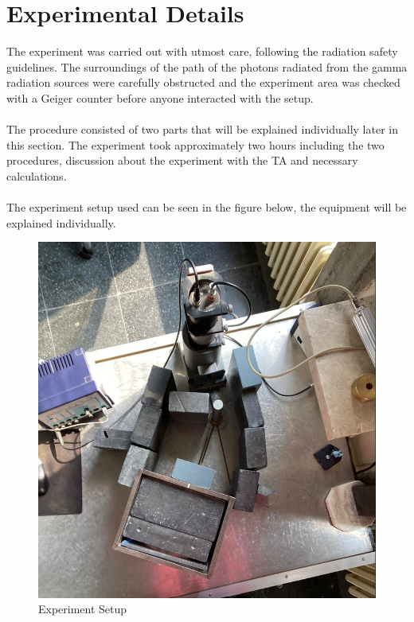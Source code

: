 \section{Experimental Details}
	The experiment was carried out with utmost care, following the radiation safety guidelines. The surroundings of the path of the photons radiated from the gamma radiation sources were carefully obstructed and the experiment area was checked with a Geiger counter before anyone interacted with the setup. 
	\\
	\\
	The procedure consisted of two parts that will be explained individually later in this section. The experiment took approximately two hours including the two procedures, discussion about the experiment with the TA and necessary calculations.
	\\
	\\
	The experiment setup used can be seen in the figure below, the equipment will be explained individually.
	
	\begin{figure}[h]
		\caption{Experiment Setup}
		\centering
		\label{fig:ExperimentSetup}
		\includegraphics[width=\textwidth / 2]{images/exp_setup.png}
	\end{figure}

